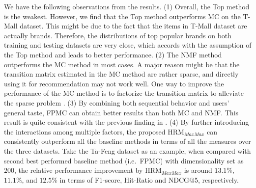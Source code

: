 \documentclass[10pt,journal,compsoc]{IEEEtran}
\begin{document}
We have the following observations from the results. (1) Overall, the Top method is the weakest.
However, we find that the Top method outperforms MC on the T-Mall dataset. This might be due to the fact that the items in T-Mall dataset are actually brands. Therefore, the distributions of top popular brands on both training and testing datasets are very close, which accords with the assumption of the Top method and leads to better performance. (2) The NMF method outperforms the MC method in most cases. A major reason might be that the transition matrix estimated in the MC method are rather sparse, and directly using it for recommendation may not work well. One way to improve the performance of the MC method is to factorize the transition matrix to alleviate the sparse problem \cite{fpmc}. (3) By combining both sequential behavior and users' general taste, FPMC can obtain better results than both MC and NMF. This result is quite consistent with the previous finding in \cite{fpmc}. (4) By further introducing the interactions among multiple factors, the proposed HRM$_{MaxMax}$ can consistently outperform all the baseline methods in terms of all the measures over the three datasets. Take the Ta-Feng dataset as an example, when compared with second best performed baseline method (i.e.~FPMC) with dimensionality set as $200$, the relative performance improvement by HRM$_{MaxMax}$ is around $13.1\%$, $11.1\%$, and $12.5\%$ in terms of F1-score, Hit-Ratio and NDCG@5, respectively.
\end{document}

